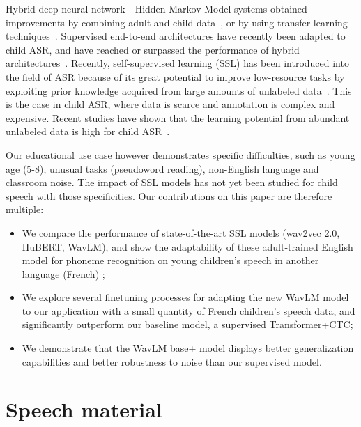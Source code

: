 \documentclass{Interspeech2024}
\begin{document}
Hybrid deep neural network - Hidden Markov Model systems obtained improvements by combining adult and child data~\cite{Serizel14-DNN}, or by using transfer learning techniques~\cite{Shivakumar20-TLF}. Supervised end-to-end architectures have recently been adapted to child ASR, and have reached or surpassed the performance of hybrid architectures~\cite{Shivakumar2021-E2E,Gelin2022-JEP}.
Recently, self-supervised learning (SSL) has been introduced into the field of ASR because of its great potential to improve low-resource tasks by exploiting prior knowledge acquired from large amounts of unlabeled data~\cite{Mohamed2022-SSspeech}.
This is the case in child ASR, where data is scarce and annotation is complex and expensive. Recent studies have shown that the learning potential from abundant unlabeled data is high for child ASR~\cite{Jain2023-AWB,Fan2022-TBD,Li2024-ASSL}. 

Our educational use case however demonstrates specific difficulties, such as young age (5-8), unusual tasks (pseudoword reading), non-English language and classroom noise. The impact of SSL models has not yet been studied for child speech with those specificities. 
Our contributions on this paper are therefore multiple:
\begin{itemize}
    \item We compare the performance of state-of-the-art SSL models (wav2vec 2.0, HuBERT, WavLM), and show the adaptability of these adult-trained English model for phoneme recognition on young children's speech in another language (French) ;
    \item We explore several finetuning processes for adapting the new WavLM model to our application with a small quantity of French children's speech data, and significantly outperform our baseline model, a supervised Transformer+CTC;
    \item We demonstrate that the WavLM base+ model displays better generalization capabilities and better robustness to noise than our supervised model.
\end{itemize}

\section{Speech material}
\end{document}
